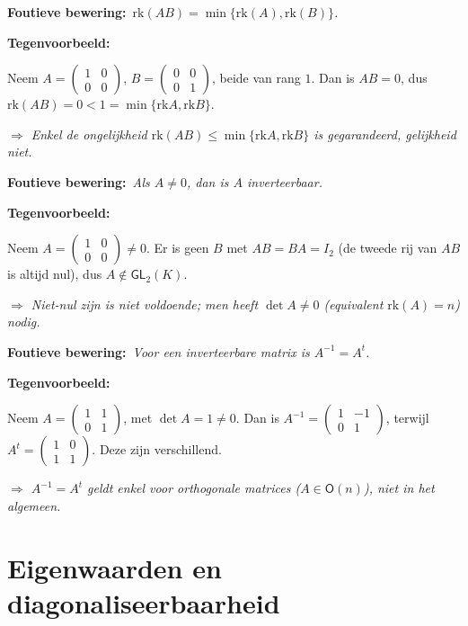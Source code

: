 \documentclass[10pt,a4paper]{article}
\newenvironment{ce}[1]{%
  \par\noindent\textbf{Foutieve bewering:}~\textit{#1}\par\noindent\textbf{Tegenvoorbeeld:}~\ignorespaces
}{%
  \par\vspace{5pt}\normalfont
}
\newcommand{\concl}[1]{\par\noindent\textit{$\Rightarrow$ #1}}
\begin{document}
\begin{ce}{$\mathrm{rk}(AB)=\min\{\mathrm{rk}(A),\mathrm{rk}(B)\}$.}
Neem $A=\begin{pmatrix}1&0\\0&0\end{pmatrix}$, $B=\begin{pmatrix}0&0\\0&1\end{pmatrix}$, beide van rang $1$. Dan is $AB=0$, dus $\mathrm{rk}(AB)=0<1=\min\{\mathrm{rk}A,\mathrm{rk}B\}$.
\concl{Enkel de ongelijkheid $\mathrm{rk}(AB)\le\min\{\mathrm{rk}A,\mathrm{rk}B\}$ is gegarandeerd, gelijkheid niet.}
\end{ce}

\begin{ce}{Als $A\ne0$, dan is $A$ inverteerbaar.}
Neem $A=\begin{pmatrix}1&0\\0&0\end{pmatrix}\ne0$. Er is geen $B$ met $AB=BA=I_2$ (de tweede rij van $AB$ is altijd nul), dus $A\notin \mathsf{GL}_2(K)$.
\concl{Niet-nul zijn is niet voldoende; men heeft $\det A\ne0$ (equivalent $\mathrm{rk}(A)=n$) nodig.}
\end{ce}

\begin{ce}{Voor een inverteerbare matrix is $A^{-1}=A^t$.}
Neem $A=\begin{pmatrix}1&1\\0&1\end{pmatrix}$, met $\det A=1\ne0$. Dan is $A^{-1}=\begin{pmatrix}1&-1\\0&1\end{pmatrix}$, terwijl $A^t=\begin{pmatrix}1&0\\1&1\end{pmatrix}$. Deze zijn verschillend.
\concl{$A^{-1}=A^t$ geldt enkel voor orthogonale matrices ($A\in \mathsf O(n)$), niet in het algemeen.}
\end{ce}

\section{Eigenwaarden en diagonaliseerbaarheid}
\end{document}
